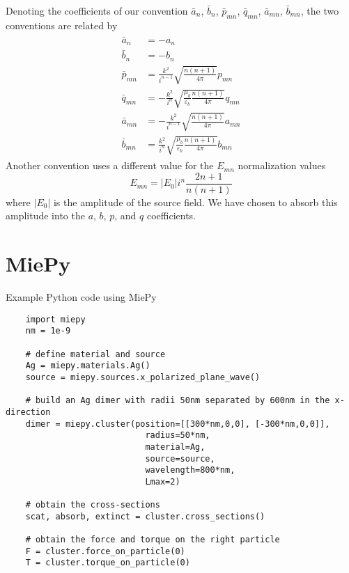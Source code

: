 \documentclass[11pt]{article}
\begin{document}
Denoting the coefficients of our convention $\bar a_n$, $\bar b_n$, $\bar p_{mn}$, $\bar q_{mn}$, $\bar a_{mn}$, $\bar b_{mn}$, the two conventions are related by
\begin{align}
\begin{split}
    \bar a_{n} &= - a_{n} \\
    \bar b_{n} &= - b_{n} \\
    \bar p_{mn} &= \frac{k^2}{i^{n-1}}\sqrt{\frac{n(n+1)}{4\pi}} p_{mn} \\
    \bar q_{mn} &= -\frac{k^2}{i^n}\sqrt{\frac{\mu_b}{\varepsilon_b} \frac{n(n+1)}{4\pi}} q_{mn} \\
    \bar a_{mn} &= -\frac{k^2}{i^{n-1}}\sqrt{\frac{n(n+1)}{4\pi}} a_{mn} \\
    \bar b_{mn} &= \frac{k^2}{i^n}\sqrt{\frac{\mu_b}{\varepsilon_b} \frac{n(n+1)}{4\pi}} b_{mn}
\end{split}
\end{align}
Another convention uses a different value for the $E_{mn}$ normalization values \cite{xu1995electromagnetic}
\begin{equation}
    E_{mn} = |E_0|i^n \frac{2n+1}{n(n+1)}
\end{equation}
where $|E_0|$ is the amplitude of the source field.
We have chosen to absorb this amplitude into the $a$, $b$, $p$, and $q$ coefficients.

\section{MiePy}

Example Python code using MiePy
\begin{lstlisting}
    import miepy
    nm = 1e-9

    # define material and source
    Ag = miepy.materials.Ag()
    source = miepy.sources.x_polarized_plane_wave()

    # build an Ag dimer with radii 50nm separated by 600nm in the x-direction
    dimer = miepy.cluster(position=[[300*nm,0,0], [-300*nm,0,0]],
                            radius=50*nm,
                            material=Ag,
                            source=source,
                            wavelength=800*nm,
                            Lmax=2)

    # obtain the cross-sections
    scat, absorb, extinct = cluster.cross_sections()

    # obtain the force and torque on the right particle
    F = cluster.force_on_particle(0)
    T = cluster.torque_on_particle(0)
\end{lstlisting}



{}
\end{document}
